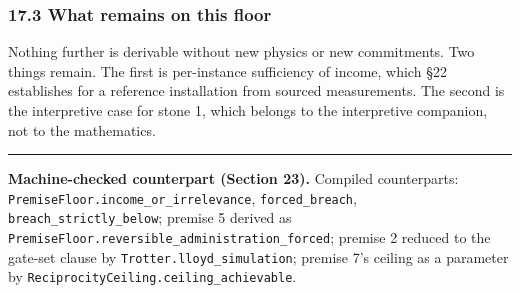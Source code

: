 \documentclass[
]{article}
\begin{document}
\subsubsection{17.3 What remains on this
floor}\label{what-remains-on-this-floor}

Nothing further is derivable without new physics or new commitments. Two
things remain. The first is per-instance sufficiency of income, which
§22 establishes for a reference installation from sourced measurements.
The second is the interpretive case for stone 1, which belongs to the
interpretive companion, not to the mathematics.

\begin{center}\rule{0.5\linewidth}{0.5pt}\end{center}

\textbf{Machine-checked counterpart (Section 23).} Compiled
counterparts:
\texttt{P\allowbreak{}r\allowbreak{}e\allowbreak{}m\allowbreak{}i\allowbreak{}s\allowbreak{}e\allowbreak{}F\allowbreak{}l\allowbreak{}o\allowbreak{}o\allowbreak{}r\allowbreak{}.\allowbreak{}i\allowbreak{}n\allowbreak{}c\allowbreak{}o\allowbreak{}m\allowbreak{}e\allowbreak{}\_\allowbreak{}o\allowbreak{}r\allowbreak{}\_\allowbreak{}i\allowbreak{}r\allowbreak{}r\allowbreak{}e\allowbreak{}l\allowbreak{}e\allowbreak{}v\allowbreak{}a\allowbreak{}n\allowbreak{}c\allowbreak{}e},
\texttt{forced\_breach},
\texttt{b\allowbreak{}r\allowbreak{}e\allowbreak{}a\allowbreak{}c\allowbreak{}h\allowbreak{}\_\allowbreak{}s\allowbreak{}t\allowbreak{}r\allowbreak{}i\allowbreak{}c\allowbreak{}t\allowbreak{}l\allowbreak{}y\allowbreak{}\_\allowbreak{}b\allowbreak{}e\allowbreak{}l\allowbreak{}o\allowbreak{}w};
premise 5 derived as
\texttt{P\allowbreak{}r\allowbreak{}e\allowbreak{}m\allowbreak{}i\allowbreak{}s\allowbreak{}e\allowbreak{}F\allowbreak{}l\allowbreak{}o\allowbreak{}o\allowbreak{}r\allowbreak{}.\allowbreak{}r\allowbreak{}e\allowbreak{}v\allowbreak{}e\allowbreak{}r\allowbreak{}s\allowbreak{}i\allowbreak{}b\allowbreak{}l\allowbreak{}e\allowbreak{}\_\allowbreak{}a\allowbreak{}d\allowbreak{}m\allowbreak{}i\allowbreak{}n\allowbreak{}i\allowbreak{}s\allowbreak{}t\allowbreak{}r\allowbreak{}a\allowbreak{}t\allowbreak{}i\allowbreak{}o\allowbreak{}n\allowbreak{}\_\allowbreak{}f\allowbreak{}o\allowbreak{}r\allowbreak{}c\allowbreak{}e\allowbreak{}d};
premise 2 reduced to the gate-set clause by
\texttt{T\allowbreak{}r\allowbreak{}o\allowbreak{}t\allowbreak{}t\allowbreak{}e\allowbreak{}r\allowbreak{}.\allowbreak{}l\allowbreak{}l\allowbreak{}o\allowbreak{}y\allowbreak{}d\allowbreak{}\_\allowbreak{}s\allowbreak{}i\allowbreak{}m\allowbreak{}u\allowbreak{}l\allowbreak{}a\allowbreak{}t\allowbreak{}i\allowbreak{}o\allowbreak{}n};
premise 7's ceiling as a parameter by
\texttt{R\allowbreak{}e\allowbreak{}c\allowbreak{}i\allowbreak{}p\allowbreak{}r\allowbreak{}o\allowbreak{}c\allowbreak{}i\allowbreak{}t\allowbreak{}y\allowbreak{}C\allowbreak{}e\allowbreak{}i\allowbreak{}l\allowbreak{}i\allowbreak{}n\allowbreak{}g\allowbreak{}.\allowbreak{}c\allowbreak{}e\allowbreak{}i\allowbreak{}l\allowbreak{}i\allowbreak{}n\allowbreak{}g\allowbreak{}\_\allowbreak{}a\allowbreak{}c\allowbreak{}h\allowbreak{}i\allowbreak{}e\allowbreak{}v\allowbreak{}a\allowbreak{}b\allowbreak{}l\allowbreak{}e}.
\end{document}
